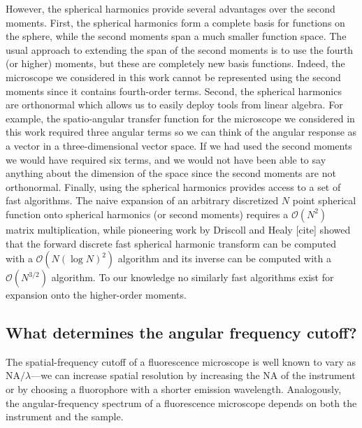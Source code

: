 \documentclass[]{osa-article}
\providecommand{\mc}[1]{\mathcal{#1}}
\begin{document}
However, the spherical harmonics provide several advantages over the second
moments. First, the spherical harmonics form a complete basis for functions on
the sphere, while the second moments span a much smaller function space. The
usual approach to extending the span of the second moments is to use the fourth
(or higher) moments, but these are completely new basis functions. Indeed, the
microscope we considered in this work cannot be represented using the second
moments since it contains fourth-order terms. Second, the spherical harmonics
are orthonormal which allows us to easily deploy tools from linear algebra. For
example, the spatio-angular transfer function for the microscope we considered
in this work required three angular terms so we can think of the angular
response as a vector in a three-dimensional vector space. If we had used the
second moments we would have required six terms, and we would not have been able
to say anything about the dimension of the space since the second moments are
not orthonormal. Finally, using the spherical harmonics provides access to a set
of fast algorithms. The naive expansion of an arbitrary discretized $N$ point
spherical function onto spherical harmonics (or second moments) requires a
$\mc{O}(N^2)$ matrix multiplication, while pioneering work by Driscoll and Healy
[cite] showed that the forward discrete fast spherical harmonic transform can be
computed with a $\mc{O}(N(\log N)^2)$ algorithm and its inverse can be computed
with a $\mc{O}(N^{3/2})$ algorithm. To our knowledge no similarly fast
algorithms exist for expansion onto the higher-order moments.

\subsection{What determines the angular frequency cutoff?}
The spatial-frequency cutoff of a fluorescence microscope is well known to vary
as NA$/\lambda$---we can increase spatial resolution by increasing the NA of the
instrument or by choosing a fluorophore with a shorter emission wavelength.
Analogously, the angular-frequency spectrum of a fluorescence microscope depends
on both the instrument and the sample.
\end{document}
